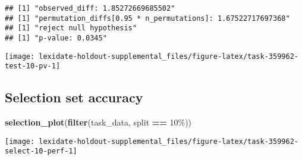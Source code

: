 \documentclass[
]{book}
\newenvironment{Shaded}{\begin{snugshade}}{\end{snugshade}}
\newcommand{\AttributeTok}[1]{\textcolor[rgb]{0.13,0.29,0.53}{#1}}
\newcommand{\DecValTok}[1]{\textcolor[rgb]{0.00,0.00,0.81}{#1}}
\newcommand{\FunctionTok}[1]{\textcolor[rgb]{0.13,0.29,0.53}{\textbf{#1}}}
\newcommand{\NormalTok}[1]{#1}
\newcommand{\OtherTok}[1]{\textcolor[rgb]{0.56,0.35,0.01}{#1}}
\newcommand{\SpecialCharTok}[1]{\textcolor[rgb]{0.81,0.36,0.00}{\textbf{#1}}}
\newcommand{\StringTok}[1]{\textcolor[rgb]{0.31,0.60,0.02}{#1}}
\begin{document}
\begin{Shaded}
\end{Shaded}

\begin{verbatim}
## [1] "observed_diff: 1.85272669685502"
## [1] "permutation_diffs[0.95 * n_permutations]: 1.67522717697368"
## [1] "reject null hypothesis"
## [1] "p-value: 0.0345"
\end{verbatim}

\texttt{[image: lexidate-holdout-supplemental\_files/figure-latex/task-359962-test-10-pv-1]}

\hypertarget{selection-set-accuracy-56}{%
\subsection{Selection set accuracy}\label{selection-set-accuracy-56}}

\begin{Shaded}
\begin{Highlighting}[]
\FunctionTok{selection\_plot}\NormalTok{(}\FunctionTok{filter}\NormalTok{(task\_data, split }\SpecialCharTok{==} \StringTok{\textquotesingle{}10\%\textquotesingle{}}\NormalTok{))}
\end{Highlighting}
\end{Shaded}

\texttt{[image: lexidate-holdout-supplemental\_files/figure-latex/task-359962-select-10-perf-1]}
\end{document}
